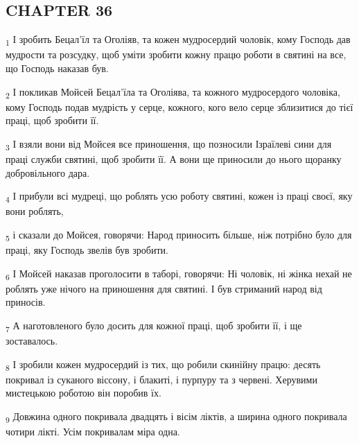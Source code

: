 \subsection{CHAPTER 36}
\begin{tcolorbox}
\textsubscript{1} І зробить Бецал'їл та Оголіяв, та кожен мудросердий чоловік, кому Господь дав мудрости та розсудку, щоб уміти зробити кожну працю роботи в святині на все, що Господь наказав був.
\end{tcolorbox}
\begin{tcolorbox}
\textsubscript{2} І покликав Мойсей Бецал'їла та Оголіява, та кожного мудросердого чоловіка, кому Господь подав мудрість у серце, кожного, кого вело серце зблизитися до тієї праці, щоб зробити її.
\end{tcolorbox}
\begin{tcolorbox}
\textsubscript{3} І взяли вони від Мойсея все приношення, що позносили Ізраїлеві сини для праці служби святині, щоб зробити її. А вони ще приносили до нього щоранку добровільного дара.
\end{tcolorbox}
\begin{tcolorbox}
\textsubscript{4} І прибули всі мудреці, що роблять усю роботу святині, кожен із праці своєї, яку вони роблять,
\end{tcolorbox}
\begin{tcolorbox}
\textsubscript{5} і сказали до Мойсея, говорячи: Народ приносить більше, ніж потрібно було для праці, яку Господь звелів був зробити.
\end{tcolorbox}
\begin{tcolorbox}
\textsubscript{6} І Мойсей наказав проголосити в таборі, говорячи: Ні чоловік, ні жінка нехай не роблять уже нічого на приношення для святині. І був стриманий народ від приносів.
\end{tcolorbox}
\begin{tcolorbox}
\textsubscript{7} А наготовленого було досить для кожної праці, щоб зробити її, і ще зоставалось.
\end{tcolorbox}
\begin{tcolorbox}
\textsubscript{8} І зробили кожен мудросердий із тих, що робили скинійну працю: десять покривал із суканого віссону, і блакиті, і пурпуру та з червені. Херувими мистецькою роботою він поробив їх.
\end{tcolorbox}
\begin{tcolorbox}
\textsubscript{9} Довжина одного покривала двадцять і вісім ліктів, а ширина одного покривала чотири лікті. Усім покривалам міра одна.
\end{tcolorbox}
